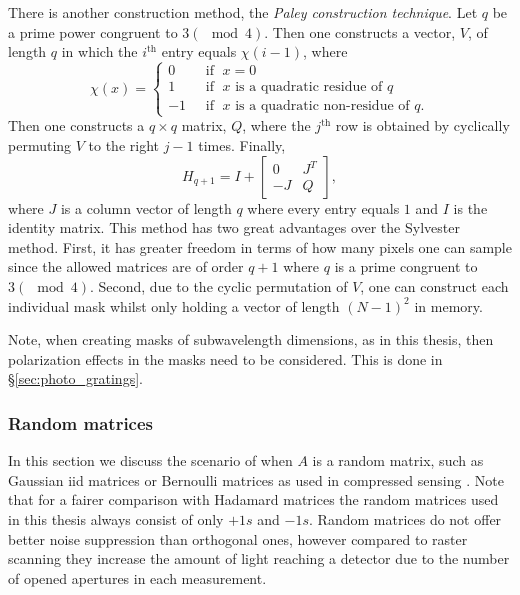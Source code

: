 There is another construction method, the \textit{Paley construction technique}. Let $q$ be a prime power congruent to $3(\mod 4)$. Then one constructs a vector, $V$, of length $q$ in which the $i^{\mbox{th}}$ entry equals $\chi(i-1)$, where 
\begin{equation}
\chi (x) = \left\{ 
\begin{aligned}
0 \;& \mbox{ if } \;x=0\\
1 \;& \mbox{ if } \;x \mbox{ is a quadratic residue of }q\\
-1 \;& \mbox{ if } \;x\mbox{ is a quadratic non-residue of }q.
\end{aligned}
\right.
\label{eq:chi_quad}
\end{equation}
Then one constructs a $q \times q$ matrix, $Q$, where the $j^{\mbox{th}}$ row is obtained by cyclically permuting $V$ to the right $j-1$ times. Finally,
\begin{equation}
H_{q+1}= I + \left[{\begin{array}{cc}0 & J^T \\ -J & Q \end{array} }\right],
\label{eq:paley_had}
\end{equation}
where $J$ is a column vector of length $q$ where every entry equals $1$ and $I$ is the identity matrix. This method has two great advantages over the Sylvester method. First, it has greater freedom in terms of how many pixels one can sample since the allowed matrices are of order $q+1$ where $q$ is a prime congruent to $3 (\mod 4)$. Second, due to the cyclic permutation of $V$, one can construct each individual mask whilst only holding a vector of length $(N-1)^2$ in memory. 

Note, when creating masks of subwavelength dimensions, as in this thesis, then polarization effects in the masks need to be considered. This is done in \S\ref{sec:photo_gratings}. 


\subsubsection{Random matrices}
In this section we discuss the scenario of when $A$ is a random matrix, such as Gaussian iid matrices or Bernoulli matrices as used in compressed sensing \cite{CC.uncertainty_principles}. Note that for a fairer comparison with Hadamard matrices the random matrices used in this thesis always consist of only $+1s$ and $-1s$. Random matrices do not offer better noise suppression than orthogonal ones, however compared to raster scanning they increase the amount of light reaching a detector due to the number of opened apertures in each measurement.

